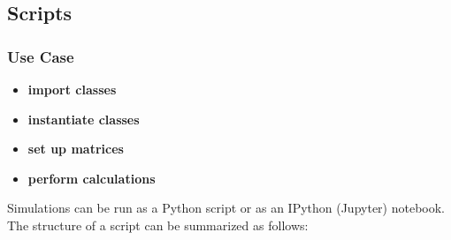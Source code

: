 \newpage


\subsection{Scripts}

\subsubsection{Use Case}

\begin{itemize}
	\item \textbf{import classes}
\end{itemize}

\begin{itemize}
	\item \textbf{instantiate classes}
\end{itemize}

\begin{itemize}
	\item \textbf{set up matrices}
\end{itemize}

\begin{itemize}
	\item \textbf{perform calculations}
\end{itemize}

Simulations can be run as a Python script or as an IPython (Jupyter) notebook. The structure of a script can be summarized as follows:

